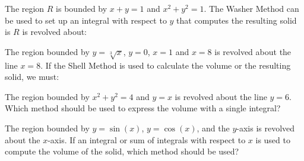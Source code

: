 \documentclass{ximera}
\author{Jim Talamo}
\begin{document}
\begin{exercise}
 The region $R$ is bounded by $x+y=1$ and $x^2+y^2=1$.  The Washer Method can be used to set up an integral with respect to $y$ that computes the resulting solid is $R$ is revolved about:
 
 
\begin{multipleChoice}
\end{multipleChoice}

\end{exercise}

\begin{exercise}
 The region bounded by $y=\sqrt[3]{x}$, $y=0$, $x=1$ and $x=8$ is revolved about the line $x=8$.  If the Shell Method is used to calculate the volume or the resulting solid, we must:
 
\begin{multipleChoice}
\end{multipleChoice}

\end{exercise}



\begin{exercise}
 The region bounded by $x^2+y^2=4$ and $y=x$ is revolved about the line $y=6$.  Which method should be used to express the volume with a single integral?

 
\begin{multipleChoice}
\end{multipleChoice}

\end{exercise}

\begin{exercise}
 The region bounded by $y=\sin(x)$, $y=\cos(x)$, and the $y$-axis is revolved about the $x$-axis.  If an integral or sum of integrals with respect to $x$ is used to compute the volume of the solid, which method should be used?
 
\begin{multipleChoice}
\end{multipleChoice}

\end{exercise}
\end{document}
